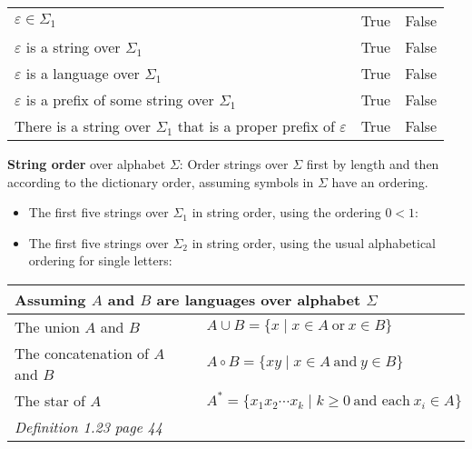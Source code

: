    \begin{center}
    \begin{tabular}{lcc}
    $\varepsilon \in \Sigma_1$ & True & False \\
    $\varepsilon$ is  a string over $\Sigma_1$ & True & False \\
    $\varepsilon$ is a language over $\Sigma_1$ & True & False \\
    $\varepsilon$ is a prefix of some string over  $\Sigma_1$ & True & False \\
    There is a string over $\Sigma_1$ that is a proper prefix of $\varepsilon$& True & False \\
    \end{tabular}
    \end{center}
    
    
    {\bf String order} over alphabet $\Sigma$: Order strings over  $\Sigma$ first by length and then according to the dictionary order, assuming symbols in $\Sigma$  have an ordering.
    
    \begin{itemize}
    \setlength{\itemsep}{10pt}
    \item[] The first five strings over $\Sigma_1$ in string order, using the ordering $0 <  1$:
    
    \item[] The first five strings over $\Sigma_2$ in string order, using the usual alphabetical ordering for single letters:
    
    \end{itemize}
    
    \begin{center}
    \begin{tabular}{|ll|}
    \hline
    \multicolumn{2}{|l|}{Assuming $A$ and $B$  are languages  over alphabet $\Sigma$}\\
    \hline
    The union $A$ and $B$   & $A \cup B = \{  x \mid x \in A~\text{or}~x  \in  B \}$ \\
    The concatenation of $A$ and $B$   & $A \circ B = \{  xy \mid x \in A~\text{and}~y  \in  B \} $ \\
    The star of $A$ & $A^* = \{ x_1 x_2 \cdots  x_k \mid k  \geq 0 ~\text{and each}~x_i \in A \}$ \\
    \hline
    {\it Definition 1.23 page 44} & \\
    \hline
    \end{tabular}
    \end{center}
    
